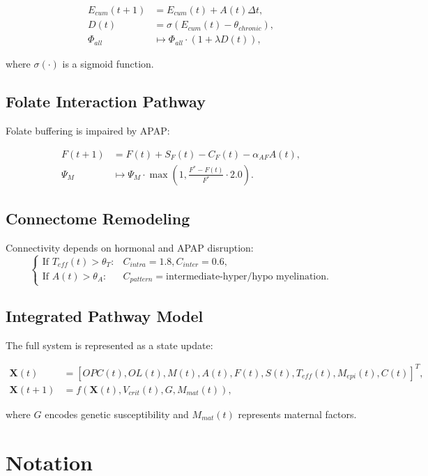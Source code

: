 \documentclass[12pt]{article}
\begin{document}
\begin{align}
E_{cum}(t+1) &= E_{cum}(t) + A(t)\Delta t, \\
D(t) &= \sigma\left(E_{cum}(t) - \theta_{chronic}\right), \\
\Phi_{all} &\mapsto \Phi_{all} \cdot (1 + \lambda D(t)),
\end{align}

where $\sigma(\cdot)$ is a sigmoid function.

\subsection{Folate Interaction Pathway}
Folate buffering is impaired by APAP:

\begin{align}
F(t+1) &= F(t) + S_F(t) - C_F(t) - \alpha_{AF}A(t), \\
\Psi_M &\mapsto \Psi_M \cdot \max\left(1, \frac{F^* - F(t)}{F^*} \cdot 2.0\right).
\end{align}

\subsection{Connectome Remodeling}
Connectivity depends on hormonal and APAP disruption:
\[
\begin{cases}
\text{If } T_{eff}(t) > \theta_T: & C_{intra} = 1.8, C_{inter} = 0.6, \\
\text{If } A(t) > \theta_A: & C_{pattern} = \text{intermediate-hyper/hypo myelination}.
\end{cases}
\]

\subsection{Integrated Pathway Model}
The full system is represented as a state update:

\begin{align}
\mathbf{X}(t) &= [OPC(t), OL(t), M(t), A(t), F(t), S(t), T_{eff}(t), M_{epi}(t), C(t)]^T, \\
\mathbf{X}(t+1) &= f(\mathbf{X}(t), V_{crit}(t), G, M_{mat}(t)),
\end{align}

where $G$ encodes genetic susceptibility and $M_{mat}(t)$ represents maternal factors.

\section{Notation}
\end{document}
